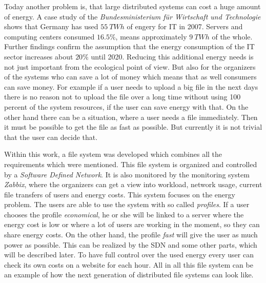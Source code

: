 Today another problem is, that large distributed systems can cost a huge amount of energy. A case study of the \textit{Bundesministerium f\"ur Wirtschaft und Technologie} shows that Germany has used $55\ TWh$ of engery for IT in 2007\cite{bmwi}. Servers and computing centers consumed $16.5 \%$, means approximately $9\ TWh$ of the whole. Further findings confirm the assumption that the energy consumption of the IT sector increases about $20 \%$ until 2020. Reducing this additional energy needs is not just important from the ecological point of view. But also for the organizers of the systems who can save a lot of money which means that as well consumers can save money. For example if a user needs to upload a big file in the next days there is no reason not to upload the file over a long time without using 100 percent of the system resources, if the user can save energy with that. On the other hand there can be a situation, where a user needs a file immediately. Then it must be possible to get the file as fast as possible. But currently it is not trivial that the user can decide that.  

Within this work, a file system was developed which combines all the requirements which were mentioned. This file system is organized and controlled by a \textit{Software Defined Network}. It is also monitored by the monitoring system \textit{Zabbix}, where the organizers can get a view into workload, network usage, current file transfers of users and energy costs. This system focuses on the energy problem. The users are able to use the system with so called \textit{profiles}. If a user chooses the profile \textit{economical}, he or she will be linked to a server where the energy cost is low or where a lot of users are working in the moment, so they can share energy costs. On the other hand, the profile \textit{fast} will give the user as much power as possible. This can be realized by the SDN and some other parts, which will be described later. To have full control over the used energy every user can check its own costs on a website for each hour. All in all this file system can be an example of how the next generation of distributed file systems can look like.             
